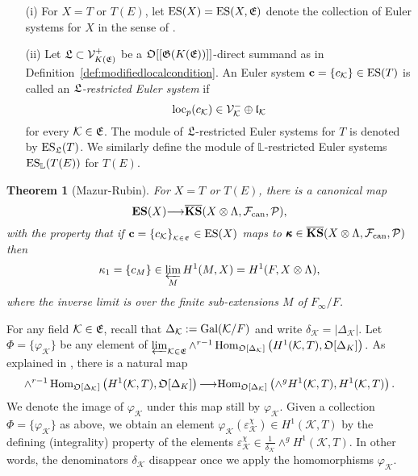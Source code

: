 \documentclass[12pt]{amsart}
\numberwithin{equation}{section}
\newtheorem{thm}{Theorem}[section]
\newenvironment{define}{\par\medskip\noindent\refstepcounter{thm}
\bgroup{\hspace*{-0.15 cm}\bf{Definition}
\thethm.}\bgroup}{\egroup \egroup\par\medskip}
\begin{document}
\begin{define}
\label{def:alrestrictedES}
\begin{itemize} 
\item[(i)]For $X=T$ or $T(E)$, let $\textup{ES}(X)=\textup{ES}(X,\frak{E})$ denote the collection of Euler systems for $X$ in the sense of \cite[\S2]{r00}.
    \item[(ii)]Let $\frak{L} \subset \mathcal{V}_{K(\frak{E})}^+$ be a ${\frak{O}}[[\frak{G}(K(\frak{E}))]]$-direct summand as in Definition~\ref{def:modifiedlocalcondition}. An Euler system $\textbf{c}=\{c_\mathcal{K}\} \in \textup{ES}(T)$ is called an \emph{$\frak{L}$-restricted Euler system} if
$$\textup{loc}_p(c_\mathcal{K}) \in \mathcal{V}_\mathcal{K}^-\oplus \frak{l}_\mathcal{K}$$
for every $\mathcal{K}\in \frak{E}$. The module of $\frak{L}$-restricted Euler systems for $T$ is denoted by $\textup{ES}_{\frak{L}}(T)$. We similarly define the module of $\mathbb{L}$-restricted Euler systems $\textup{ES}_{\mathbb{L}}(T(E))$ for $T(E)$.
    \end{itemize}
\end{define}

\begin{thm}[Mazur-Rubin]
\label{thm:ESKSmain} For $X=T$ or $T(E)$, there is a canonical map
$${\textbf{\textup{ES}}}(X) {\longrightarrow} \overline{\textbf{\textup{KS}}}(X\otimes{\Lambda},{\mathcal{F}_{\textup{\lowercase{can}}}},{\mathcal{P}}),$$
with the property that if $\mathbf{c}=\{c_{\mathcal{K}}\}_{_{{\mathcal{K}}\in\frak{E}}} \in \textup{ES}(X)$ maps to $\pmb{\kappa} \in \overline{\textbf{\textup{KS}}}(X\otimes{\Lambda},{\mathcal{F}_{\textup{\lowercase{can}}}},{\mathcal{P}})$ then
$$\kappa_1=\{c_{M}\} \in \varprojlim_{M} H^1(M,X)=H^1(F,X\otimes{\Lambda}),$$
where the inverse limit is over the finite sub-extensions $M$ of $F_{\infty}/F$.
\end{thm}

For any field ${\mathcal{K}}\in\frak{E}$, recall that $\Delta_{\mathcal{K}}:={\textup{Gal}}({\mathcal{K}}/F)$ and write $\delta_{\mathcal{K}}=|\Delta_{\mathcal{K}}|$. Let $\varPhi=\{\varphi_{\mathcal{K}}\}$ be any element of $\varprojlim_{{\mathcal{K}} \in \frak{E}} \wedge^{r-1}\,\hbox{Hom}_{{\frak{O}}[\Delta_{\mathcal{K}}]}\left(H^1({\mathcal{K}},T), {\frak{O}}[\Delta_K]\right).$ As explained in \cite[\S1.2]{ru96}, there is a natural map $$\wedge^{r-1}\,\hbox{Hom}_{{\frak{O}}[\Delta_{\mathcal{K}}]}\left(H^1({\mathcal{K}},T), {\frak{O}}[\Delta_K]\right){\longrightarrow} \hbox{Hom}_{{\frak{O}}[\Delta_{\mathcal{K}}]}\left(\wedge^g H^1({\mathcal{K}},T), H^1({\mathcal{K}},T)\right).$$
We denote the image of $\varphi_{\mathcal{K}}$ under this map  still by $\varphi_{\mathcal{K}}$. Given a collection $\varPhi=\{\varphi_{\mathcal{K}}\}$ as above, we obtain an element   $\varphi_{\mathcal{K}}(\varepsilon_{\mathcal{K}}^\chi) \in H^1({\mathcal{K}},T)$ by the defining (integrality) property of the elements $\varepsilon_{\mathcal{K}}^\chi \in \frac{1}{\delta_{\mathcal{K}}} \wedge^g H^1({\mathcal{K}},T)$. In other words, the denominators $\delta_{\mathcal{K}}$ disappear once we apply the homomorphisms $\varphi_{\mathcal{K}}$.
\end{document}
